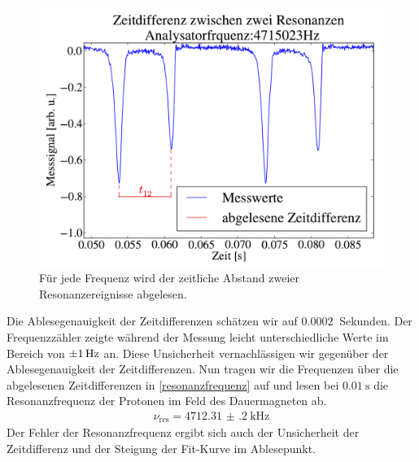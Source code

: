 \documentclass[paper=a4,
	fontsize=10pt,
	DIV=18,
	twocolumn,
	parskip=half
	]{scrartcl}
\numberwithin{equation}{section}    %
\begin{document}
\begin{figure}[t!]
	\begin{center}
		\includegraphics[width=\columnwidth]{Data-Plots/02-Zeitabstaende.pdf}
		\caption{Für jede Frequenz wird der zeitliche Abstand zweier Resonanzereignisse abgelesen.}
		\label{t12}
	\end{center}
\end{figure}
Die Ablesegenauigkeit der Zeitdifferenzen schätzen wir auf $\SI{0.0002}{}$ Sekunden. 
Der Frequenzzähler zeigte während der Messung leicht unterschiedliche Werte im Bereich von $\SI{\pm 1}{\hertz}$ an.
Diese Unsicherheit vernachlässigen wir gegenüber der Ablesegenauigkeit der Zeitdifferenzen.
Nun tragen wir die Frequenzen über die abgelesenen Zeitdifferenzen  in \cref{resonanzfrequenz} auf und lesen bei $\SI{0.01}{\second}$ die Resonanzfrequenz der Protonen im Feld des Dauermagneten ab.
\begin{align}
	\nu_{\mathrm{res}}=\SI{4712.31(20)}{\kilo\hertz}
\end{align}
Der Fehler der Resonanzfrequenz ergibt sich auch der Unsicherheit der Zeitdifferenz und der Steigung der Fit-Kurve im Ablesepunkt.
\end{document}
